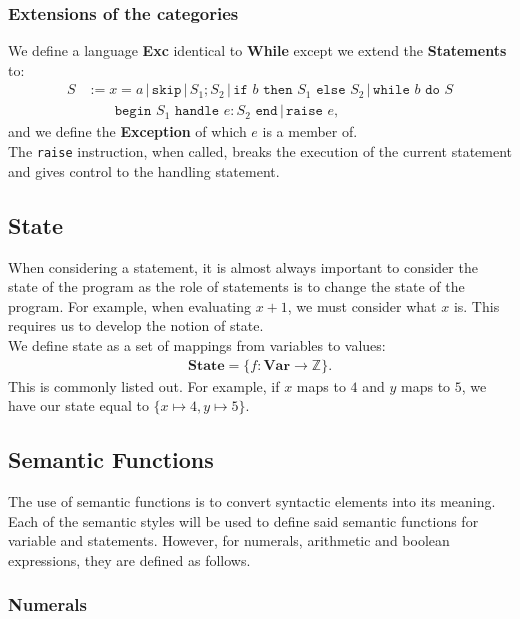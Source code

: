 \documentclass[a4paper, 12pt, twoside]{article}
\begin{document}
\subsubsection{Extensions of the categories}

We define a language \textbf{Exc} identical to \textbf{While} except we
extend the \textbf{Statements} to: \begin{align*}
  S &:= x = a \, | \, \texttt{skip} \, | \, S_1 ; S_2 \, | \, \texttt{if }
  b \texttt{ then } S_1 \texttt{ else } S_2 \, | \, \texttt{while } 
  b \texttt{ do } S \\
  & \qquad \texttt{begin } S_1 \texttt{ handle } e : S_2 \texttt{ end} \, |
  \, \texttt{raise } e,
\end{align*} and we define the \textbf{Exception} of which $e$ is a member of.
\\[\baselineskip]
The \texttt{raise} instruction, when called, breaks the execution of
the current statement and gives control to the handling statement.

\subsection{State}

When considering a statement, it is almost always important to consider the
state of the program as the role of statements is to change the state
of the program. For example, when evaluating $x + 1$, we must consider
what $x$ is. This requires us to develop the notion of state.
\\[\baselineskip]
We define state as a set of mappings from variables to values: \begin{gather*}
  \textbf{State} = \{f : \textbf{Var} \to \mathbb{Z}\}.
\end{gather*} This is commonly listed out. For example, if $x$ maps to $4$ and 
$y$ maps to $5$, we have our state equal to $\{x \mapsto 4, y \mapsto 5\}$. 

\subsection{Semantic Functions}

The use of semantic functions is to convert syntactic elements into its meaning.
Each of the semantic styles will be used to define said semantic functions
for variable and statements. However, for numerals, arithmetic and boolean
expressions, they are defined as follows. 

\subsubsection{Numerals}
\end{document}
